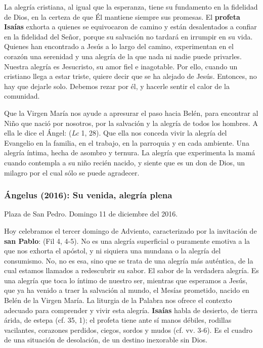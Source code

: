 \begin{body}
\begin{body}
La alegría cristiana, al igual que la esperanza, tiene su fundamento en la fidelidad de Dios, en la certeza de que Él mantiene siempre sus promesas. El \textbf{profeta Isaías} exhorta a quienes se equivocaron de camino y están desalentados a confiar en la fidelidad del Señor, porque su salvación no tardará en irrumpir en su vida. Quienes han encontrado a Jesús a lo largo del camino, experimentan en el corazón una serenidad y una alegría de la que nada ni nadie puede privarles. Nuestra alegría es Jesucristo, su amor fiel e inagotable. Por ello, cuando un cristiano llega a estar triste, quiere decir que se ha alejado de Jesús. Entonces, no hay que dejarle solo. Debemos rezar por él, y hacerle sentir el calor de la comunidad.

Que la Virgen María nos ayude a apresurar el paso hacia Belén, para encontrar al Niño que nació por nosotros, por la salvación y la alegría de todos los hombres. A ella le dice el Ángel:  (\emph{Lc} 1, 28). Que ella nos conceda vivir la alegría del Evangelio en la familia, en el trabajo, en la parroquia y en cada ambiente. Una alegría íntima, hecha de asombro y ternura. La alegría que experimenta la mamá cuando contempla a su niño recién nacido, y siente que es un don de Dios, un milagro por el cual sólo se puede agradecer.

\subsubsection{Ángelus (2016): Su venida, alegría plena}

Plaza de San Pedro. Domingo 11 de diciembre del 2016.

Hoy celebramos el tercer domingo de Adviento, caracterizado por la invitación de \textbf{san Pablo}:  (Fil 4, 4-5). No es una alegría superficial o puramente emotiva a la que nos exhorta el apóstol, y ni siquiera una mundana o la alegría del consumismo. No, no es esa, sino que se trata de una alegría más auténtica, de la cual estamos llamados a redescubrir su sabor. El sabor de la verdadera alegría. Es una alegría que toca lo íntimo de nuestro ser, mientras que esperamos a Jesús, que ya ha venido a traer la salvación al mundo, el Mesías prometido, nacido en Belén de la Virgen María. La liturgia de la Palabra nos ofrece el contexto adecuado para comprender y vivir esta alegría. \textbf{Isaías} habla de desierto, de tierra árida, de estepa (cf. 35, 1); el profeta tiene ante sí manos débiles, rodillas vacilantes, corazones perdidos, ciegos, sordos y mudos (cf. vv. 3-6). Es el cuadro de una situación de desolación, de un destino inexorable sin Dios.


\end{body}
\end{body}
